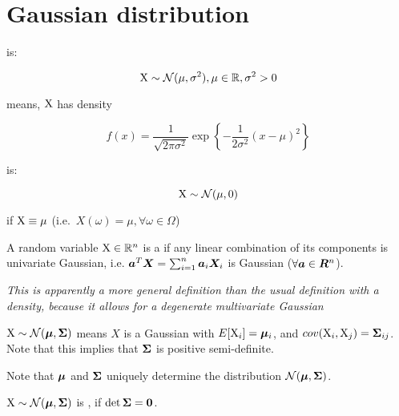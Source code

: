 \chapter{Gaussian distribution}

\begin{defn}
 is:

\begin{equation}
    {\textnormal{X}} \sim {\mathcal{N}}(\mu, \sigma^2), \mu \in {\mathbb{R}}, \sigma^2 > 0
\end{equation}

means, ${\textnormal{X}}$ has density

\begin{equation}
    f(x) = \frac{1}{\sqrt{2 \pi \sigma^2}} \exp{ \left\{ -\frac{1}{2\sigma^2} (x - \mu)^2 \right\}}
\end{equation}
\end{defn}

\begin{defn}
 is:

\begin{equation}
    {\textnormal{X}} \sim {\mathcal{N}}(\mu, 0)
\end{equation}

if ${\textnormal{X}} \equiv \mu$ (i.e.\ $X(\omega) = \mu, \forall \omega \in \Omega$)
\end{defn}

\begin{defn}
A random variable ${\textnormal{X}} \in {\mathbb{R}}^n$ is a  if any linear combination of its components is univariate Gaussian, i.e. ${\bm{a}}^T {\bm{X}} = \sum_{i=1}^n {\bm{a}}_i {\bm{X}}_i$ is Gaussian ($\forall {\bm{a}} \in {\bm{R}}^n$).

\emph{This is apparently a more general definition than the usual definition with a density, because it allows for a degenerate multivariate Gaussian}
\end{defn}

\begin{defn}
${\textnormal{X}} \sim {\mathcal{N}}({\bm{\mu}}, {\bm{\Sigma}})$ means $X$ is a Gaussian with $E[{\textnormal{X}}_i] = {\bm{\mu}}_i$, and $cov({\textnormal{X}}_i, {\textnormal{X}}_j) = {\bm{\Sigma}}_{ij}$. Note that this implies that ${\bm{\Sigma}}$ is positive semi-definite.
\end{defn}

Note that ${\bm{\mu}}$ and ${\bm{\Sigma}}$ uniquely determine the distribution ${\mathcal{N}}({\bm{\mu}}, {\bm{\Sigma}})$. 

\begin{defn}
${\textnormal{X}} \sim {\mathcal{N}}({\bm{\mu}}, {\bm{\Sigma}})$ is , if $\det {\bm{\Sigma}} = {\bm{0}}$.
\end{defn}

